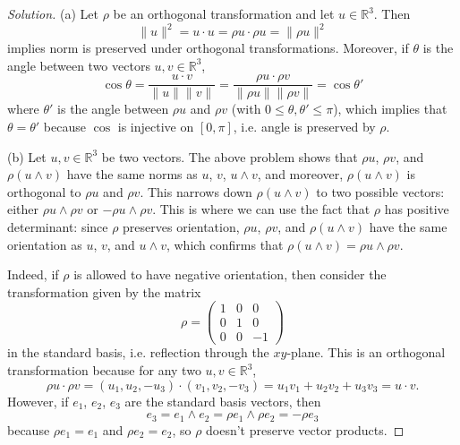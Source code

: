 \documentclass[11pt]{scrartcl}
\providecommand{\RR}{\mathbb R}
\newenvironment{soln}{\begin{proof}[Solution]}{\end{proof}}
\begin{document}
\begin{soln}
	(a) Let $\rho$ be an orthogonal transformation and let $u\in\RR^3$. Then
	\[\|u\|^2 = u\cdot u = \rho u\cdot\rho u = \|\rho u\|^2\]
	implies norm is preserved under orthogonal transformations.
	Moreover, if $\theta$ is the angle between two vectors $u,v\in\RR^3$,
	\[\cos\theta = \frac{u\cdot v}{\|u\|\|v\|}
	= \frac{\rho u\cdot \rho v}{\|\rho u\|\|\rho v\|} = \cos\theta'\]
	where $\theta'$ is the angle between $\rho u$ and $\rho v$
	(with $0\le\theta, \theta' \le \pi$), which implies that
	$\theta = \theta'$ because $\cos$ is injective on $[0,\pi]$,
	i.e. angle is preserved by $\rho$.
	
	(b) Let $u,v\in\RR^3$ be two vectors. The above problem shows
	that $\rho u$, $\rho v$, and $\rho (u\wedge v)$
	have the same norms as $u$, $v$, $u\wedge v$, and moreover,
	$\rho(u\wedge v)$ is orthogonal to $\rho u$ and $\rho v$.
	This narrows down $\rho(u\wedge v)$ to two possible vectors:
	either $\rho u\wedge \rho v$ or $-\rho u\wedge\rho v$.
	This is where we can use the fact that $\rho$ has positive determinant:
	since $\rho$ preserves orientation,
	$\rho u$, $\rho v$, and $\rho (u\wedge v)$ have the same orientation
	as $u$, $v$, and $u\wedge v$,
	which confirms that $\rho(u\wedge v) = \rho u\wedge\rho v$.
	
	Indeed, if $\rho$ is allowed to have negative orientation, then
	consider the transformation given by the matrix
	\[\rho = \begin{pmatrix}
		1&0&0\\0&1&0\\0&0&-1
	\end{pmatrix}\]
	in the standard basis, i.e. reflection through the $xy$-plane.
	This is an orthogonal transformation because for any two $u,v\in\RR^3$,
	\[\rho u\cdot\rho v = (u_1,u_2,-u_3)\cdot(v_1,v_2,-v_3) =
	u_1v_1 + u_2v_2 + u_3v_3 =
	u\cdot v.\]
	However, if $e_1$, $e_2$, $e_3$ are the standard basis vectors, then
	\[e_3 = e_1\wedge e_2 = \rho e_1 \wedge \rho e_2 = -\rho e_3\]
	because $\rho e_1 = e_1$ and $\rho e_2 = e_2$,
	so $\rho$ doesn't preserve vector products.
	

\end{soln}
\end{document}
